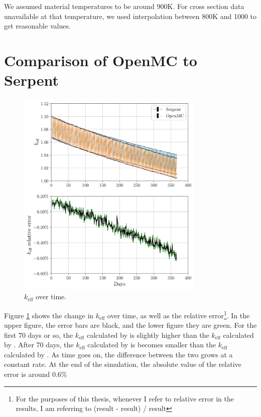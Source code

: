 We assumed material temperatures to be around 900K. For cross section data
unavailable at that temperature, we used interpolation between 800K and 1000
to get reasonable values.

\section{Comparison of OpenMC to Serpent}
\label{sec:openmc-vs-serpent}

\begin{figure}[htpb]
    \centering
    \includegraphics[width=0.8\textwidth]{figs/ch5/keff.pdf}
    \caption{$k_\text{eff}$ over time.}
    \label{fig:keff}
\end{figure}

Figure \ref{fig:keff} shows the change in $k_\text{eff}$ over time, as well as
the relative error\footnote{For the purposes of this thesis, whenever I refer
to relative error in the results, I am referring to (\OpenMC result -
\SerpentTWO result) / \SerpentTWO result}. In the upper figure, the error bars
are black, and the lower figure they are green. For the first 70 days or so, the
$k_\text{eff}$ calculated by \OpenMC is slightly  higher than the 
$k_\text{eff}$ calculated by \SerpentTWO. After 70 days, the $k_\text{eff}$
calculated by \OpenMC is becomes smaller than the $k_\text{eff}$ calculated by
\SerpentTWO. As time goes on, the difference between the two grows at a constant
rate. At the end of the simulation, the absolute value of the relative error is
around 0.6\%

